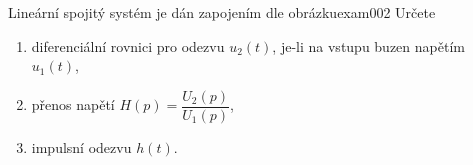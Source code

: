 \begin{tkyexam}{Lineární spojitý systém je dán zapojením dle obrázku}{exam002}
  Určete
  \begin{enumerate}[leftmargin=12pt,noitemsep]
    \item diferenciální rovnici pro odezvu $u_2(t)$, je-li na vstupu buzen napětím $u_1(t)$,
    \item přenos napětí $H(p)=\dfrac{U_2(p)}{U_1(p)}$,
    \item impulsní odezvu $h(t)$.
  \end{enumerate}
  
  {\centering
   \captionsetup{type=figure}
   \label{tky:fig008}
  \par}


\end{tkyexam}

